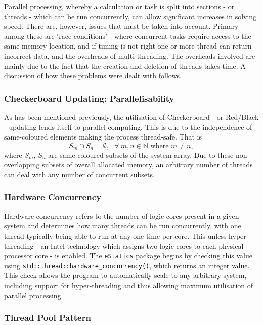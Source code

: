 	Parallel processing, whereby a calculation or task is split into sections - or threads - which can be run concurrently, can allow significant increases in solving speed. There are, however, issues that must be taken into account. Primary among these are `race conditions' - where concurrent tasks require access to the same memory location, and if timing is not right one or more thread can return incorrect data, and the overheads of multi-threading. The overheads involved are mainly due to the fact that the creation and deletion of threads takes time. A discussion of how these problems were dealt with follows.
		
		\subsubsection{Checkerboard Updating: Parallelisability}
		
		As has been mentioned previously, the utilisation of Checkerboard - or Red/Black - updating lends itself to parallel computing. This is due to the independence of same-coloured elements making the process thread-safe. That is 
		\[
		S_m \cap S_n = \emptyset, \ \ \ \forall \  m, n \in \mathbb{N} \text{ where } m \neq n,
		\]
		where $S_m$, $S_n$ are same-coloured subsets of the system array. Due to these non-overlapping subsets of overall allocated memory, an arbitrary number of threads can deal with any number of concurrent subsets.
		
		\subsubsection{Hardware Concurrency}
		
			Hardware concurrency refers to the number of logic cores present in a given system and determines how many threads can be run concurrently, with one thread typically being able to run at any one time per core. This unless hyper-threading - an Intel technology which assigns two logic cores to each physical processor core - is enabled. The \lstinline|eStatics| package begins by checking this value using \lstinline|std::thread::hardware_concurrency()|, which returns an integer value. This check allows the program to automatically scale to any arbitrary system, including support for hyper-threading and thus allowing maximum utilisation of parallel processing.
		
		\subsubsection{Thread Pool Pattern}
		
